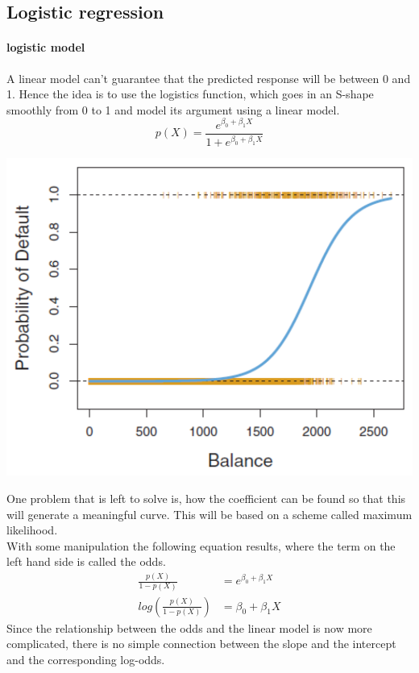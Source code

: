 \documentclass[../document.tex]{subfiles}
\begin{document}
	\subsection{Logistic regression}

	\paragraph{logistic model}
	A linear model can't guarantee that the predicted response will be between 0 and 1. Hence the idea is to use the logistics function, which goes in an S-shape smoothly from 0 to 1 and model its argument using a linear model.
	\begin{equation}
		p(X)=\frac{e^{\beta_{0}+\beta_{1}X}}{1+e^{\beta_{0}+\beta_{1}X}}
	\end{equation}
	\begin{center}
		\includegraphics[width=.35\textwidth]{pictures/logistic_regression}
	\end{center}
	One problem that is left to solve is, how the coefficient can be found so that this will generate a meaningful curve. This will be based on a scheme called maximum likelihood.\\
	With some manipulation the following equation results, where the term on the left hand side is called the odds.
	\begin{equation}
	\begin{split}
		\frac{p(X)}{1-p(X)}&=e^{\beta_{0}+\beta_{1}X}\\
		log(\frac{p(X)}{1-p(X)})&=\beta_{0}+\beta_{1}X
	\end{split}
	\end{equation}
	Since the relationship between the odds and the linear model is now more complicated, there is no simple connection between the slope and the intercept and the corresponding log-odds.
\end{document}
